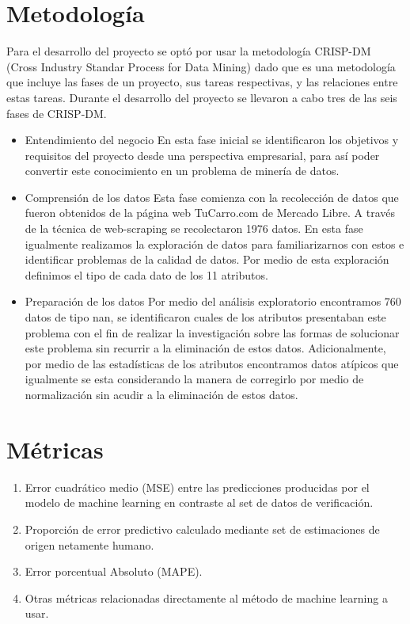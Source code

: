 \documentclass[journal]{..//IEEEtran/IEEEtran}
\begin{document}
\section{Metodología}

Para el desarrollo del proyecto se optó por usar la metodología CRISP-DM (Cross Industry Standar Process for Data Mining) dado que es una metodología que incluye las fases de un proyecto, sus tareas respectivas, y las relaciones entre estas tareas. Durante el desarrollo del proyecto se llevaron a cabo tres de las seis fases de CRISP-DM.

\begin{itemize}
    \item Entendimiento del negocio
    En esta fase inicial se identificaron los objetivos y requisitos del proyecto desde una perspectiva empresarial, para así poder convertir este conocimiento en un problema de minería de datos.
    \item Comprensión de los datos
    Esta fase comienza con la recolección de datos que fueron obtenidos de la página web TuCarro.com de Mercado Libre. A través de la técnica de web-scraping se recolectaron 1976 datos. En esta fase igualmente realizamos la exploración de datos para familiarizarnos con estos e identificar problemas de la calidad de datos. Por medio de esta exploración definimos el tipo de cada dato de los 11 atributos.
    \item Preparación de los datos
    Por medio del análisis exploratorio encontramos 760 datos de tipo nan, se identificaron cuales de los atributos presentaban este problema con el fin de realizar la investigación sobre las formas de solucionar este problema sin recurrir a la eliminación de estos datos. Adicionalmente, por medio de las estadísticas de los atributos encontramos datos atípicos que igualmente se esta considerando la manera de corregirlo por medio de normalización sin acudir a la eliminación de estos datos.

    
\end{itemize}
    



\section{Métricas}

\begin{enumerate}
    \item Error cuadrático medio (MSE) entre las predicciones producidas por el modelo de machine learning en contraste al set de datos de verificación. 
    \item Proporción de error predictivo calculado mediante set de estimaciones de origen netamente humano.
    \item Error porcentual Absoluto (MAPE).
    \item Otras métricas relacionadas directamente al método de machine learning a usar.
\end{enumerate}
\end{document}

